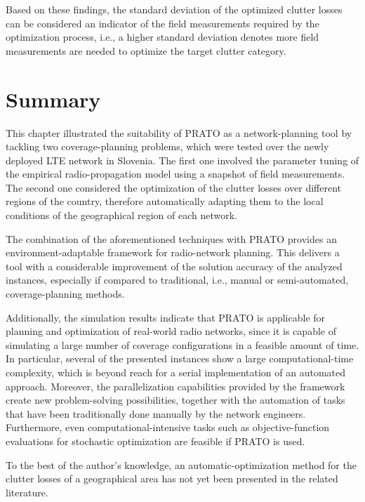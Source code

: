 Based on these findings, the standard deviation of the optimized clutter
losses can be considered an indicator of the field measurements required
by the optimization process, i.e., a higher standard deviation denotes
more field measurements are needed to optimize the target clutter
category.


\section{Summary}

This chapter illustrated the suitability of PRATO as a network-planning
tool by tackling two coverage-planning problems, which were tested
over the newly deployed LTE network in Slovenia. The first one involved
the parameter tuning of the empirical radio-propagation model using
a snapshot of field measurements. The second one considered the optimization
of the clutter losses over different regions of the country, therefore
automatically adapting them to the local conditions of the geographical
region of each network.

The combination of the aforementioned techniques with PRATO provides
an environment-adaptable framework for radio-network planning. This
delivers a tool with a considerable improvement of the solution accuracy
of the analyzed instances, especially if compared to traditional,
i.e., manual or semi-automated, coverage-planning methods.

Additionally, the simulation results indicate that PRATO is applicable
for planning and optimization of real-world radio networks, since
it is capable of simulating a large number of coverage configurations
in a feasible amount of time. In particular, several of the presented
instances show a large computational-time complexity, which is beyond
reach for a serial implementation of an automated approach. Moreover,
the parallelization capabilities provided by the framework create
new problem-solving possibilities, together with the automation of
tasks that have been traditionally done manually by the network engineers.
Furthermore, even computational-intensive tasks such as objective-function
evaluations for stochastic optimization are feasible if PRATO is used.

To the best of the author's knowledge, an automatic-optimization method
for the clutter losses of a geographical area has not yet been presented
in the related literature.

